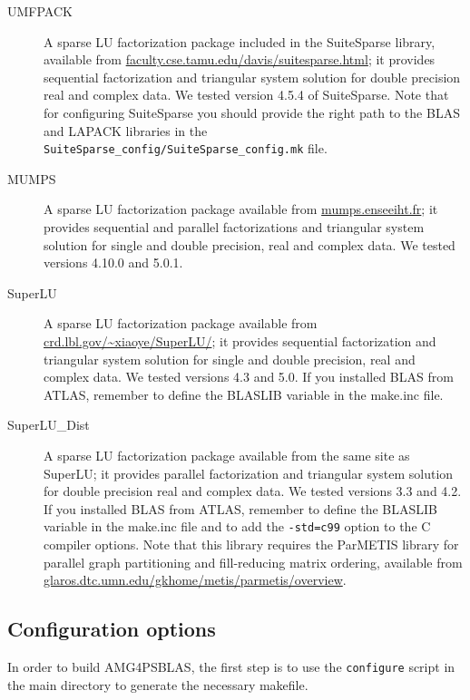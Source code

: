 \begin{description}
\item[UMFPACK] \cite{UMFPACK}
  A sparse LU factorization package included in the SuiteSparse library, available from
  \url{faculty.cse.tamu.edu/davis/suitesparse.html};
  it provides sequential factorization and triangular system solution for double
  precision real and complex data. We tested version 4.5.4 of SuiteSparse.
  Note that for configuring SuiteSparse you should provide the right path to the BLAS
  and LAPACK libraries in the \verb|SuiteSparse_config/SuiteSparse_config.mk| file.
\item[MUMPS] \cite{MUMPS}
  A sparse LU factorization package available from \url{mumps.enseeiht.fr};
  it provides sequential and parallel factorizations and triangular system solution
  for single and double precision, real and complex data.
  We tested versions 4.10.0 and 5.0.1.
\item[SuperLU] \cite{SUPERLU}
  A sparse LU factorization package available from
  \url{crd.lbl.gov/~xiaoye/SuperLU/}; it provides sequential
  factorization and triangular system solution for single and double precision,
  real and complex data. We tested versions 4.3 and 5.0. If you installed BLAS from
  ATLAS, remember to define the BLASLIB variable in the make.inc file.
 \item[SuperLU\_Dist] \cite{SUPERLUDIST}
   A sparse LU factorization package available
   from the same site as SuperLU; it provides parallel factorization and
   triangular system solution for double precision real and complex data.
   We tested versions 3.3 and 4.2. If you installed BLAS from
   ATLAS, remember to define the BLASLIB variable in the make.inc file and
   to add the \verb|-std=c99| option to the C compiler options.
   Note that this library requires the ParMETIS
   library for parallel graph partitioning and fill-reducing matrix ordering, available from
   \url{glaros.dtc.umn.edu/gkhome/metis/parmetis/overview}.
\end{description}

\subsection{Configuration options}

In order to build AMG4PSBLAS, the first step is to use the \verb|configure| script
in the main directory to generate the necessary makefile.

